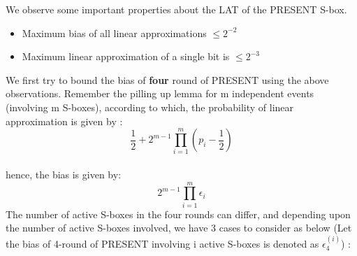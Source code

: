 \documentclass[journal=tosc,preprint]{iacrtrans}
\begin{document}
We observe some important properties about the LAT of the PRESENT S-box.
\begin{itemize}
	\item Maximum bias of all linear approximations $ \le 2^{-2}$
	\item Maximum linear approximation of a single bit is $\le 2^{-3}$
\end{itemize}
   We first try to bound the bias of \textbf{four} round of PRESENT using the above observations. Remember the pilling up lemma for m independent events (involving m S-boxes), according to which, the probability of linear approximation is given by :
\begin{equation*}
\frac{1}{2} + 2^{m-1} \prod_{i=1}^{m} \left( p_i  - \frac{1}{2} \right)
\end{equation*}\\
hence, the bias is given by:
\begin{equation*}
2^{m-1}\prod_{i=1}^{m} \epsilon_i
\end{equation*}
The number of active S-boxes in the four rounds can differ, and depending upon the number of active S-boxes involved, we have 3 cases to consider as below (Let the bias of 4-round of PRESENT involving i active S-boxes is denoted as $\epsilon_4^{(i)}$) : 
\end{document}
